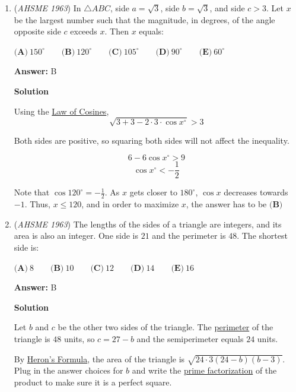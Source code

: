 \begin{enumerate}
 


	\item (\textit{AHSME 1963}) In $\triangle ABC$, side $a = \sqrt{3}$, side $b = \sqrt{3}$, and side $c > 3$. Let $x$ be the largest number such that the magnitude, 
in degrees, of the angle opposite side $c$ exceeds $x$. Then $x$ equals:


 $\textbf{(A)}\ 150^{\circ} \qquad \textbf{(B)}\ 120^{\circ}\qquad \textbf{(C)}\ 105^{\circ} \qquad \textbf{(D)}\ 90^{\circ} \qquad \textbf{(E)}\ 60^{\circ}$

 \textbf{Answer: }B



\textbf{Solution}

Using the \href{https://artofproblemsolving.com/wiki/index.php?title=Law\_of\_Cosines}{Law of Cosines},
 \[\sqrt{3 + 3 - 2\cdot 3 \cdot \cos{x^\circ}}>3\]

 Both sides are positive, so squaring both sides will not affect the inequality.

 
 \[6 - 6 \cos{x^\circ}>9\]
 \[\cos{x^\circ} < -\frac{1}{2}\]

 Note that $\cos{120^\circ} = -\frac{1}{2}$.  As $x$ gets closer to $180^{\circ}$, $\cos{x}$ decreases towards $-1$.  Thus, $x \leq 120$, and in order to maximize $x$, the answer has to be $\boxed{\textbf{(B)}}$



	\item (\textit{AHSME 1963}) The lengths of the sides of a triangle are integers, and its area is also an integer. 
One side is $21$ and the perimeter is $48$. The shortest side is:


 $\textbf{(A)}\ 8 \qquad \textbf{(B)}\ 10\qquad \textbf{(C)}\ 12 \qquad \textbf{(D)}\ 14 \qquad \textbf{(E)}\ 16$

 \textbf{Answer: }B



\textbf{Solution}

Let $b$ and $c$ be the other two sides of the triangle.  The \href{https://artofproblemsolving.com/wiki/index.php?title=Perimeter}{perimeter} of the triangle is $48$ units, so $c = 27-b$ and the semiperimeter equals $24$ units.

 By \href{https://artofproblemsolving.com/wiki/index.php?title=Heron\%27s\_Formula}{Heron's Formula}, the area of the triangle is $\sqrt{24 \cdot 3(24-b)(b-3)}$.  Plug in the answer choices for $b$ and write the \href{https://artofproblemsolving.com/wiki/index.php?title=Prime\_factorization}{prime factorization} of the product to make sure it is a perfect square.


\end{enumerate}

